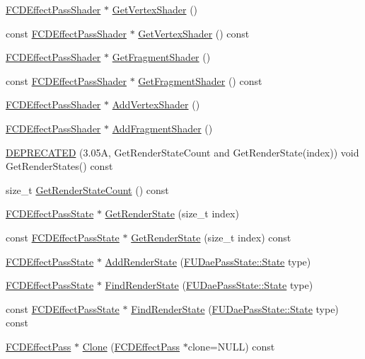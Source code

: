 \begin{DoxyCompactItemize}
\hyperlink{classFCDEffectPassShader}{FCDEffectPassShader} $\ast$ \hyperlink{classFCDEffectPass_ad5be823d1fcf2b809d88edc3d4bd128e}{GetVertexShader} ()
\item 
const \hyperlink{classFCDEffectPassShader}{FCDEffectPassShader} $\ast$ \hyperlink{classFCDEffectPass_a33ba661e6fd6321720446a0a8c194182}{GetVertexShader} () const 
\item 
\hyperlink{classFCDEffectPassShader}{FCDEffectPassShader} $\ast$ \hyperlink{classFCDEffectPass_a5c2d7a6cb07d072474a712d7989b0c47}{GetFragmentShader} ()
\item 
const \hyperlink{classFCDEffectPassShader}{FCDEffectPassShader} $\ast$ \hyperlink{classFCDEffectPass_af897aa752fb8efce514b5fa78a0c1f9c}{GetFragmentShader} () const 
\item 
\hyperlink{classFCDEffectPassShader}{FCDEffectPassShader} $\ast$ \hyperlink{classFCDEffectPass_a38b4b91ed84a52f4b3b4f564bc145adc}{AddVertexShader} ()
\item 
\hyperlink{classFCDEffectPassShader}{FCDEffectPassShader} $\ast$ \hyperlink{classFCDEffectPass_a994019f83ec1f8664ebe944ac1853972}{AddFragmentShader} ()
\item 
\hyperlink{classFCDEffectPass_a751132054a8fe95f6113ee1dce669315}{DEPRECATED} (3.05A, GetRenderStateCount and GetRenderState(index)) void GetRenderStates() const 
\item 
size\_\-t \hyperlink{classFCDEffectPass_ac7b761be64722700e0896574d039a927}{GetRenderStateCount} () const 
\item 
\hyperlink{classFCDEffectPassState}{FCDEffectPassState} $\ast$ \hyperlink{classFCDEffectPass_a2d9d4bc7ef4a68f0eef84fa133bf2bf4}{GetRenderState} (size\_\-t index)
\item 
const \hyperlink{classFCDEffectPassState}{FCDEffectPassState} $\ast$ \hyperlink{classFCDEffectPass_a53757eb176c01b3d5014ec405d70949b}{GetRenderState} (size\_\-t index) const 
\item 
\hyperlink{classFCDEffectPassState}{FCDEffectPassState} $\ast$ \hyperlink{classFCDEffectPass_a0693c21a2306025fc8853295c07b6927}{AddRenderState} (\hyperlink{namespaceFUDaePassState_a99a648050f80bc29359e932cffa8c973}{FUDaePassState::State} type)
\item 
\hyperlink{classFCDEffectPassState}{FCDEffectPassState} $\ast$ \hyperlink{classFCDEffectPass_ac145319a544b80a7cb1f013609e5ccfa}{FindRenderState} (\hyperlink{namespaceFUDaePassState_a99a648050f80bc29359e932cffa8c973}{FUDaePassState::State} type)
\item 
const \hyperlink{classFCDEffectPassState}{FCDEffectPassState} $\ast$ \hyperlink{classFCDEffectPass_a613603555b9bae099c4eba84290db2c1}{FindRenderState} (\hyperlink{namespaceFUDaePassState_a99a648050f80bc29359e932cffa8c973}{FUDaePassState::State} type) const 
\item 
\hyperlink{classFCDEffectPass}{FCDEffectPass} $\ast$ \hyperlink{classFCDEffectPass_a42e60c76a99dff70809a727a87d757ea}{Clone} (\hyperlink{classFCDEffectPass}{FCDEffectPass} $\ast$clone=NULL) const 
\end{DoxyCompactItemize}


